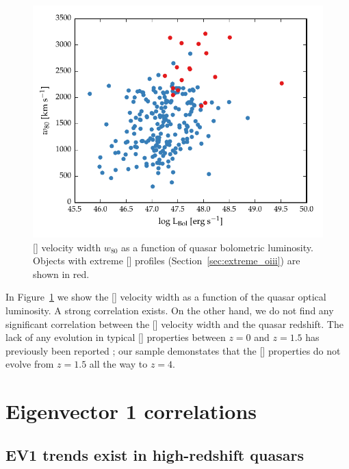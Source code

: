 \begin{figure}[t!]
    \centering
    \includegraphics[width=\columnwidth]{figures/chapter04/lum_w80.pdf} 
    \caption[{}]{[] velocity width $w_{80}$ as a function of quasar bolometric luminosity. Objects with extreme [] profiles (Section~\ref{sec:extreme_oiii}) are shown in red.}     
    \label{fig:lum_w80}
\end{figure}

In Figure~\ref{fig:lum_w80} we show the [] velocity width as a function of the quasar optical luminosity.
A strong correlation exists. 
On the other hand, we do not find any significant correlation between the [] velocity width and the quasar redshift. 
The lack of any evolution in typical [] properties between $z=0$ and $z=1.5$ has previously been reported \citep[e.g.][]{harrison16}; our sample demonstates that the [] properties do not evolve from $z=1.5$ all the way to $z=4$. 

\section{Eigenvector 1 correlations}

\subsection{EV1 trends exist in high-redshift quasars}

